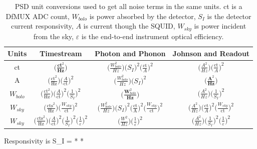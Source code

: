 \begin{table}[ht!]
\begin{center}
\begin{tabular}{|c|c|c|c|}
\hline Units & Timestream & Photon and Phonon & Johnson and Readout \\ 
\hline ct & $\big( \frac{\textbf{ct}^2}{\textbf{Hz}} \big)$ & $\big( \frac{W_{bolo}^2}{Hz} \big)   \big( S_I \big) ^2 \big( \frac{\text{ct}}{A} \big) ^2$ & $\big( \frac{A^2}{Hz} \big) \big( \frac{\text{ct}}{A} \big) ^2 $ \\ 
\hline A & $\big( \frac{\text{ct}^2}{\text{Hz}} \big) \big( \frac{A}{\text{ct}} \big) ^2 $ & $\big( \frac{W_{bolo}^2}{Hz} \big) \big( S_I \big) ^2$ & $\big( \frac{\textbf{A}^2}{\textbf{Hz}} \big)$ \\ 
\hline $W_{bolo}$ & $\big( \frac{\text{ct}^2}{\text{Hz}} \big) \big( \frac{A}{\text{ct}} \big) ^2 \big( \frac{1}{S_I} \big) ^2$ & $\big( \frac{\textbf{W}_{bolo}^2}{\textbf{Hz}} \big)$ & $\big( \frac{A^2}{Hz} \big) \big( \frac{1}{S_I} \big) ^2$ \\ 
\hline $W_{sky}$ &  $\big( \frac{\text{cts}^2}{\text{Hz}} \big) \big( \frac{W_{sky}}{\text{ct}} \big) ^2$ & $\big( \frac{W_{bolo}^2}{Hz} \big) \big( S_I \big) ^2 \big( \frac{\text{ct}}{\text{A}} \big) ^2 \big( \frac{W_{sky}}{\text{ct}} \big) ^2$ & $\big( \frac{A^2}{Hz} \big) \big( \frac{\text{ct}}{A} \big) ^2 \big( \frac{W_{sky}}{\text{ct}} \big) ^2$ \\ 
\hline $W_{sky}$ & $\big( \frac{\text{cts}^2}{\text{Hz}} \big) \big( \frac{A}{\text{ct}} \big) ^2 \big( \frac{1}{S_I} \big) ^2 \big( \frac{1}{\varepsilon} \big) ^2$ & $\big( \frac{W^2}{Hz} \big)  \big( \frac{1}{\varepsilon} \big) ^2$ &  $\big( \frac{A^2}{Hz} \big) \big( \frac{1}{S_I} \big) ^2 \big( \frac{1}{\varepsilon} \big) ^2 $ \\
\hline
\end{tabular}
\end{center}
\caption{\ac{PSD} unit conversions used to get all noise terms in the same units. ct is a \ac{DfMUX} \ac{ADC} count, $W_{bolo}$ is power absorbed by the detector, $S_{I}$ is the detector current responsivity, $A$ is current though the \ac{SQUID}, $W_{sky}$ is power incident from the sky, $\varepsilon$ is the end-to-end instrument optical efficiency. %
}
\label{psd_table}
\end{table}



Responsivity is
\be
S_I =  *  * 
\label{eq:current_responsivity}
\ee

